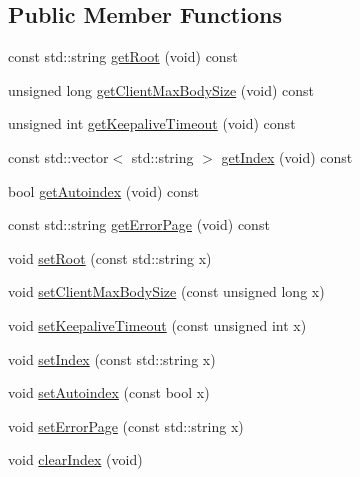 \subsection*{Public Member Functions}
\begin{DoxyCompactItemize}
\item 
const std\+::string \hyperlink{classft_1_1_base_directives_aa5dbcb08bda0a0e7e502d2df7cf64287}{get\+Root} (void) const
\item 
unsigned long \hyperlink{classft_1_1_base_directives_a930398ba1e4b99b2ba01a60dcda0c923}{get\+Client\+Max\+Body\+Size} (void) const
\item 
unsigned int \hyperlink{classft_1_1_base_directives_ab8574338758f65325cab5d1c394826c8}{get\+Keepalive\+Timeout} (void) const
\item 
const std\+::vector$<$ std\+::string $>$ \hyperlink{classft_1_1_base_directives_a018f34a5ffd66e891494b5c0ee69177b}{get\+Index} (void) const
\item 
bool \hyperlink{classft_1_1_base_directives_a4c11ed7ad76aeac228b029a2444de568}{get\+Autoindex} (void) const
\item 
const std\+::string \hyperlink{classft_1_1_base_directives_a3cb0c21f17781de392d5ee09d7190caf}{get\+Error\+Page} (void) const
\item 
void \hyperlink{classft_1_1_base_directives_a2a7990e309f7e38f2915dbbb0d2704cf}{set\+Root} (const std\+::string x)
\item 
void \hyperlink{classft_1_1_base_directives_a39bf4922f3236043c76beaffaa557a3b}{set\+Client\+Max\+Body\+Size} (const unsigned long x)
\item 
void \hyperlink{classft_1_1_base_directives_a0818b8529872ba9622329e2118d20c39}{set\+Keepalive\+Timeout} (const unsigned int x)
\item 
void \hyperlink{classft_1_1_base_directives_a6d3d8fd6eaaf71304128af6b3cee2a69}{set\+Index} (const std\+::string x)
\item 
void \hyperlink{classft_1_1_base_directives_ae7293c7bbf34e9bdc60c540dccd53342}{set\+Autoindex} (const bool x)
\item 
void \hyperlink{classft_1_1_base_directives_a505ecc88b3e1779583ad60cc243c7769}{set\+Error\+Page} (const std\+::string x)
\item 
void \hyperlink{classft_1_1_base_directives_a36d96dc74e650162c25a325813130ab2}{clear\+Index} (void)
\end{DoxyCompactItemize}
